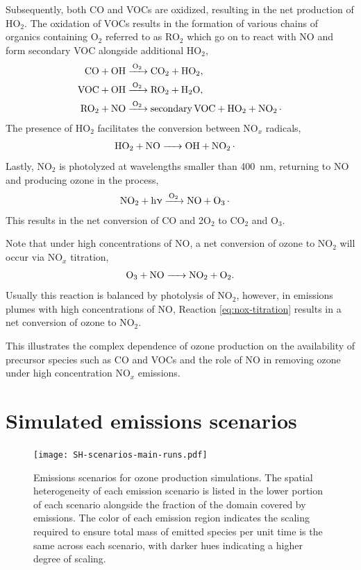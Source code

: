 Subsequently, both CO and VOCs are oxidized, resulting in the net production of HO$_2$. The oxidation of VOCs results in the formation of various chains of organics containing O$_2$ referred to as RO$_2$ which go on to react with NO and form secondary VOC alongside additional HO$_2$, 
\begin{align}
    \ce{
    CO + OH &->[O_2] CO_2 + HO_2, \\ 
   VOC + OH &->[O_2] RO_2 + H_2O, \\
   RO_2 + NO &->[O_2] secondary VOC + HO_2 + NO_2.
       }
\end{align}
The presence of HO$_2$ facilitates the conversion between NO$_x$ radicals, 
\begin{align}
    \ce{
    HO_2 + NO &-> OH + NO_2. 
       }
\end{align}
Lastly, NO$_2$ is photolyzed at wavelengths smaller than 400~nm, returning to NO and producing ozone in the process,
\begin{align}
\ce{NO_2 + h\nu &->[O_2] NO + O_3.}
\end{align}
This results in the net conversion of CO and 2O$_2$ to CO$_2$ and O$_3$. 

Note that under high concentrations of NO, a net conversion of ozone to NO$_2$ will occur via NO$_x$ titration, 
\begin{equation}
\ce{O_3 + NO -> NO_2 + O_2}.
\label{eq:nox-titration}
\end{equation}
Usually this reaction is balanced by photolysis of NO$_2$, however, in emissions plumes with high concentrations of NO, Reaction \ref{eq:nox-titration} results in a net conversion of ozone to NO$_2$. 

This illustrates the complex dependence of ozone production on the availability of precursor species such as CO and VOCs and the role of NO in removing ozone under high concentration NO$_x$ emissions. 

\section{Simulated emissions scenarios}\label{gas-emission-scenarios}

\begin{figure}[h]
	\centering
	\texttt{[image: SH-scenarios-main-runs.pdf]}
	\caption{Emissions scenarios for ozone production simulations. The spatial heterogeneity of each emission scenario is listed in the lower portion of each scenario alongside the fraction of the domain covered by emissions. The color of each emission region indicates the scaling required to ensure total mass of emitted species per unit time is the same across each scenario, with darker hues indicating a higher degree of scaling.}
	\label{fig:ozone-emission-patterns}
\end{figure}

